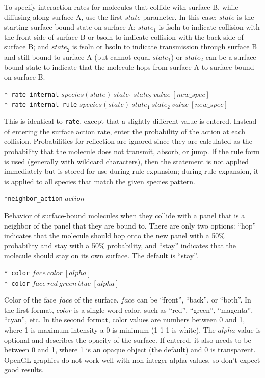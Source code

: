 \documentclass {scrbook}
\newcommand {\ttt} {\texttt}
\begin{document}
\begin{description}
To specify interaction rates for molecules that collide with surface B, while diffusing along surface A, use the first $state$ parameter. In this case: $state$ is the starting surface-bound state on surface A; $state_1$ is fsoln to indicate collision with the front side of surface B or bsoln to indicate collision with the back side of surface B; and $state_2$ is fsoln or bsoln to indicate transmission through surface B and still bound to surface A (but cannot equal $state_1$) or $state_2$ can be a surface-bound state to indicate that the molecule hops from surface A to surface-bound on surface B.

\item{\ttt{* rate\_internal} $species(state)\ state_1\ state_2\ value\ [new\_spec]$\\
\ttt{* rate\_internal\_rule} $species(state)\ state_1\ state_2\ value\ [new\_spec]$}

This is identical to \ttt{rate}, except that a slightly different value is entered. Instead of entering the surface action rate, enter the probability of the action at each collision. Probabilities for reflection are ignored since they are calculated as the probability that the molecule does not transmit, absorb, or jump. If the rule form is used (generally with wildcard characters), then the statement is not applied immediately but is stored for use during rule expansion; during rule expansion, it is applied to all species that match the given species pattern.

\item{\ttt{*neighbor\_action} $action$}

Behavior of surface-bound molecules when they collide with a panel that is a neighbor of the panel that they are bound to. There are only two options: ``hop'' indicates that the molecule should hop onto the new panel with a 50\% probability and stay with a 50\% probability, and ``stay'' indicates that the molecule should stay on its own surface. The default is ``stay''.

\item{\ttt{* color} $face\ color\ [alpha]$\\
\ttt{* color} $face\ red\ green\ blue\ [alpha]$}

Color of the face $face$ of the surface. $face$ can be ``front'', ``back'', or ``both''. In the first format, $color$ is a single word color, such as ``red'', ``green'', ``magenta'', ``cyan'', etc. In the second format, color values are numbers between 0 and 1, where 1 is maximum intensity a 0 is minimum (1 1 1 is white). The $alpha$ value is optional and describes the opacity of the surface. If entered, it also needs to be between 0 and 1, where 1 is an opaque object (the default) and 0 is transparent. OpenGL graphics do not work well with non-integer alpha values, so don't expect good results.


\end{description}
\end{document}
